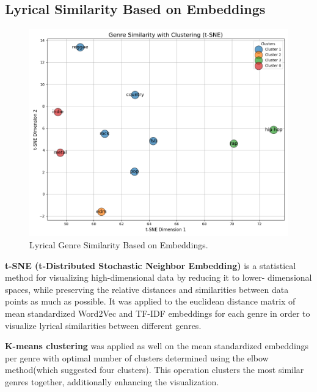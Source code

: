 \subsection{Lyrical Similarity Based on Embeddings}
\begin{center}
\begin{figure}[H]
  \centering
  \includegraphics[width=6in]{img/tsne_genres.png}
  \caption{Lyrical Genre Similarity Based on Embeddings.}
  \label{Figure:dendrogram_spotify_features}
\end{figure}
\end{center}
\textbf{t-SNE (t-Distributed Stochastic Neighbor Embedding)} is a statistical method for
visualizing high-dimensional data by reducing it to lower- dimensional spaces,
while preserving the relative distances and similarities between data points as
much as possible. It was applied to the euclidean distance matrix of mean
standardized Word2Vec and TF-IDF embeddings for each genre in order to
visualize lyrical similarities between different genres.

\textbf{K-means clustering} was applied as well on the mean standardized embeddings per
genre with optimal number of clusters determined using the elbow method(which
suggested four clusters). This operation clusters the most similar genres
together, additionally enhancing the visualization.


